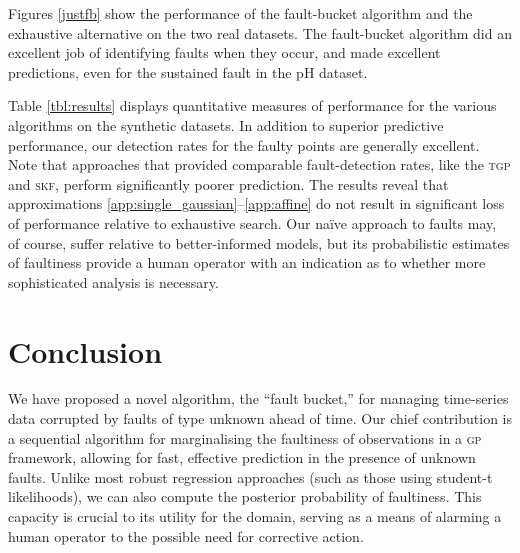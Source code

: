 \documentclass[letterpaper]{article}
\newcommand{\acro}[1]{\textsc{\MakeLowercase{#1}}}
\begin{document}


Figures \ref{justfb} show the performance of the
fault-bucket algorithm and the exhaustive alternative on the two real datasets. The fault-bucket algorithm did an excellent
job of identifying faults when they occur, and made excellent
predictions, even for the sustained fault in the pH dataset. 

Table \ref{tbl:results} displays quantitative measures of performance
for the various algorithms on the synthetic
datasets.  
In addition to superior predictive performance, our
detection rates for the faulty points are generally excellent. Note that approaches that provided comparable fault-detection rates, like the \acro{tgp} and \acro{skf}, perform significantly poorer prediction.
The results reveal that approximations \ref{app:single_gaussian}--\ref{app:affine} do not result in significant loss of performance relative to exhaustive search. Our na\"{i}ve approach to faults may, of course, suffer relative to better-informed models, but its probabilistic estimates of faultiness provide a human operator with an indication as to whether more sophisticated analysis is necessary.



\section{Conclusion}
We have proposed a novel algorithm, the ``fault bucket,'' for managing
time-series data corrupted by faults of type unknown ahead of time. Our chief
contribution is a sequential algorithm for marginalising the
faultiness of observations in a \acro{gp} framework, allowing for
fast, effective prediction in the presence of unknown faults. Unlike most robust regression approaches (such as those using student-t likelihoods), we can also compute the posterior probability of faultiness. This capacity is crucial to its utility for the domain, serving as a means of alarming a human operator to the possible need for corrective action. 
\end{document}

